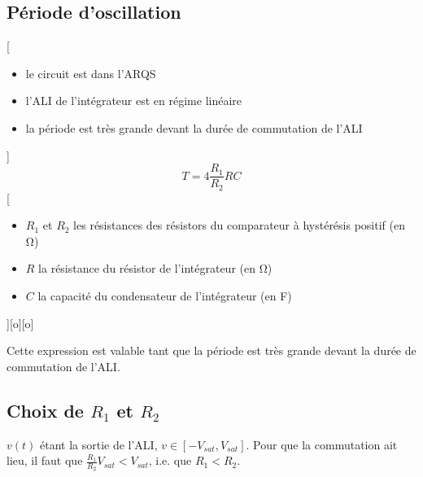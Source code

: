 \subsection{Période d'oscillation}

[
  \begin{itemize}
    \item le circuit est dans l'ARQS
    \item l'ALI de l'intégrateur est en régime linéaire
    \item la période est très grande devant la durée de commutation de l'ALI
  \end{itemize}
]
{$$T=4\frac{R_1}{R_2}RC$$}
[
  \begin{itemize}
    \item $R_1$ et $R_2$ les résistances des résistors du comparateur à hystérésis positif (en \unit{\ohm})
    \item $R$ la résistance du résistor de l'intégrateur (en \unit{\ohm})
    \item $C$ la capacité du condensateur de l'intégrateur (en \unit{F})
  \end{itemize}
][o][o]

Cette expression est valable tant que la période est très grande devant la durée de commutation de l'ALI.



\subsection{Choix de $R_1$ et $R_2$}

$v(t)$ étant la sortie de l'ALI, $v\in [-V_{sat},V_{sat}]$. Pour que la commutation ait lieu, il faut que $\frac{R_1}{R_2}V_{sat}<V_{sat}$, i.e. que $R_1<R_2$.
